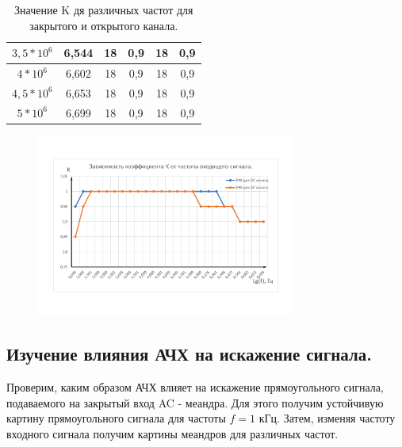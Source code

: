 \documentclass[12pt,a4paper]{article}
\begin{document}
\begin{table}[t]
\begin{center}
\begin{tabular}{|c|c|c|c|c|c|}
$3,5*10^{6} $& 6,544 & 18  & 0,9     & 18  & 0,9     \\ \hline
$4*10^{6}   $& 6,602 & 18  & 0,9     & 18  & 0,9     \\ \hline
$4,5*10^{6}$ & 6,653 & 18  & 0,9     & 18  & 0,9     \\ \hline
$5*10^{6}$   & 6,699 & 18  & 0,9     & 18  & 0,9     \\ \hline
\end{tabular}
\caption{Значение K дя различных частот для закрытого и открытого канала.}
\label{tab:amplfreqparamAC_DC}
\end{center}
\end{table}


\begin{figure}[h!]
	\begin{center}
		\includegraphics[width = 0.76\textwidth]{Amplitude-frequency-characteristic_AC_DC_graph}
		\label{fig:Amplitude-frequency-characteristic_AC_DC_graph}
	\end{center}
\end{figure}
		
	\subsection{Изучение влияния АЧХ на искажение сигнала.}
	
	Проверим, каким образом АЧХ влияет на искажение прямоугольного сигнала, подаваемого на закрытый вход AC - меандра. Для этого получим устойчивую картину прямоугольного сигнала для частоты $ f = 1$ кГц. Затем, изменяя частоту входного сигнала получим картины меандров для различных частот.
	
\end{document}
